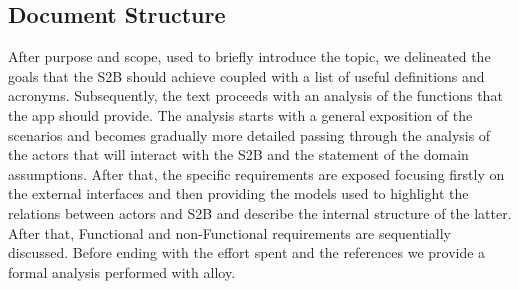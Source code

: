 \subsection{Document Structure}
After purpose and scope, used to briefly introduce the topic, we delineated the goals that the S2B should achieve coupled with a list of useful definitions and acronyms.
Subsequently, the text proceeds with an analysis of the functions that the app should provide. The analysis starts with a general exposition of the scenarios and becomes gradually more detailed passing through the analysis of the actors that will interact with the S2B and the statement of the domain assumptions.
After that, the specific requirements are exposed focusing firstly on the external interfaces and then providing the models used to highlight the relations between actors and S2B and describe the internal structure of the latter.
After that, Functional and non-Functional requirements are sequentially discussed.
Before ending with the effort spent and the references we provide a formal analysis performed with alloy.